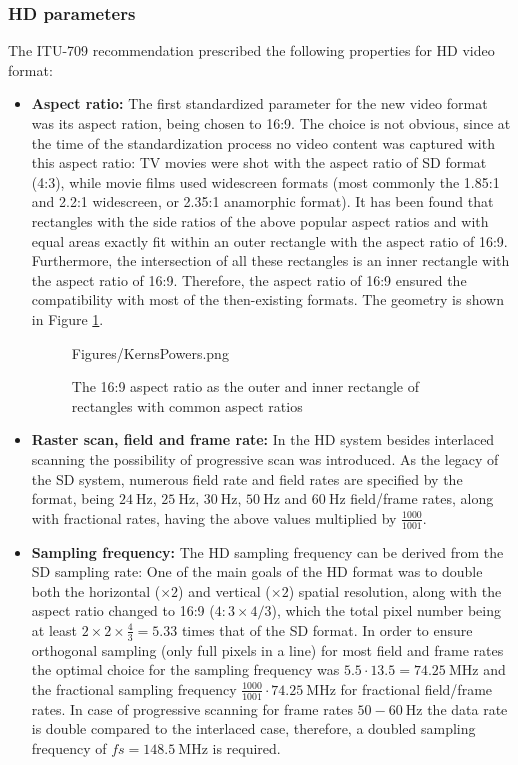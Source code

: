 \subsubsection*{HD parameters}

The ITU-709 recommendation prescribed the following properties for HD video format:
\begin{itemize}
\item \textbf{Aspect ratio:} The first standardized parameter for the new video format was its aspect ration, being chosen to 16:9.
The choice is not obvious, since at the time of the standardization process no video content was captured with this aspect ratio: 
TV movies were shot with the aspect ratio of SD format (4:3), while movie films used widescreen formats (most commonly the 1.85:1 and 2.2:1 widescreen, or 2.35:1 anamorphic format).
It has been found that rectangles with the side ratios of the above popular aspect ratios and with equal areas exactly fit within an outer rectangle with the aspect ratio of 16:9.
Furthermore, the intersection of all these rectangles is an inner rectangle with the aspect ratio of 16:9.
Therefore, the aspect ratio of 16:9 ensured the compatibility with most of the then-existing formats.
The geometry is shown in Figure \ref{Fig:kerns_powers}.
%
\begin{figure}[]
	\centering
	\begin{overpic}[width = 0.9 \columnwidth ]{Figures/KernsPowers.png}
	\small
	\end{overpic}
	\caption{The 16:9 aspect ratio as the outer and inner rectangle of rectangles with common aspect ratios}
	\label{Fig:kerns_powers}
\end{figure}
%
\item \textbf{Raster scan, field and frame rate:}
In the HD system besides interlaced scanning the possibility of progressive scan was introduced.
As the legacy of the SD system, numerous field rate and field rates are specified by the format, being $24~\mathrm{Hz}$, $25~\mathrm{Hz}$, $30~\mathrm{Hz}$, $50~\mathrm{Hz}$ and $60~\mathrm{Hz}$ field/frame rates, along with fractional rates, having the above values multiplied by $\frac{1000}{1001}$.


\item \textbf{Sampling frequency:}
The HD sampling frequency can be derived from the SD sampling rate:
One of the main goals of the HD format was to double both the horizontal ($\times 2$) and vertical ($\times 2$) spatial resolution, along with the aspect ratio changed to 16:9 ($4 : 3 \times 4/3$), which the total pixel number being at least $2\times 2 \times \frac{4}{3} = 5.33$ times that of the SD format.
In order to ensure orthogonal sampling (only full pixels in a line) for most field and frame rates the optimal choice for the sampling frequency was $5.5 \cdot 13.5 = 74.25~\mathrm{MHz}$ and the fractional sampling frequency $\frac{1000}{1001} \cdot 74.25~\mathrm{MHz}$ for fractional field/frame rates.
In case of progressive scanning for frame rates $50-60~\mathrm{Hz}$ the data rate is double compared to the interlaced case, therefore, a doubled sampling frequency of $fs = 148.5~\mathrm{MHz}$ is required.


\end{itemize}
